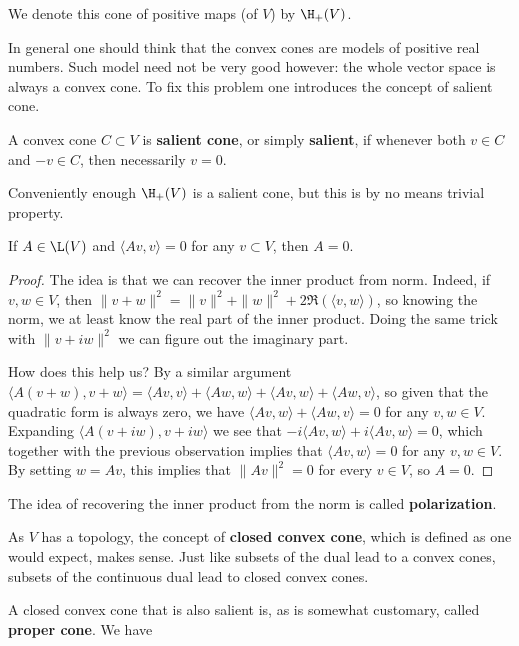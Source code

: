 We denote this cone of positive maps (of $V$) by $\H_{+}(V)$.

In general one should think that the convex cones are models of positive real numbers. Such model need not be very good however: the whole vector space is always a convex cone. To fix this problem one introduces the concept of salient cone.

\begin{maar}
	A convex cone $C \subset V$ is \textbf{salient cone}, or simply \textbf{salient}, if whenever both $v \in C$ and $-v \in C$, then necessarily $v = 0$.
\end{maar}

Conveniently enough $\H_{+}(V)$ is a salient cone, but this is by no means trivial property.

\begin{lem}\label{inj_compr}
	If $A \in \L(V)$ and $\langle A v, v \rangle = 0$ for any $v \subset V$, then $A = 0$.
\end{lem} 
\begin{proof}
	The idea is that we can recover the inner product from norm. Indeed, if $v, w \in V$, then $\|v + w\|^2 = \|v\|^2 + \|w\|^2 + 2 \Re(\langle v, w \rangle)$, so knowing the norm, we at least know the real part of the inner product. Doing the same trick with $\|v + i w\|^2$ we can figure out the imaginary part.

	How does this help us? By a similar argument $\langle A(v + w), v + w \rangle = \langle A v, v \rangle + \langle A w, w \rangle + \langle A v, w\rangle + \langle A w, v \rangle$, so given that the quadratic form is always zero, we have $\langle A v, w \rangle + \langle A w, v \rangle = 0$ for any $v, w \in V$. Expanding $\langle A (v + i w), v + i w \rangle$ we see that $-i \langle A v, w \rangle + i \langle A v, w \rangle = 0$, which together with the previous observation implies that $\langle A v , w \rangle = 0$ for any $v, w \in V$. By setting $w = A v$, this implies that $\|A v\|^{2} = 0$ for every $v \in V$, so $A = 0$.
\end{proof}

The idea of recovering the inner product from the norm is called \textbf{polarization}.

As $V$ has a topology, the concept of \textbf{closed convex cone}, which is defined as one would expect, makes sense. Just like subsets of the dual lead to a convex cones, subsets of the continuous dual lead to closed convex cones.

A closed convex cone that is also salient is, as is somewhat customary, called \textbf{proper cone}. We have

